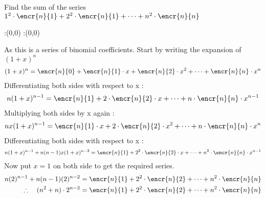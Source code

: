 



\question Find the sum of the series \\
$1^2 \cdot \encr{n}{1} + 2^2 \cdot \encr{n}{1} + \cdots + n^2 \cdot \encr{n}{n} $



\ifprintanswers
  \begin{marginfigure}
      :(0,0)
      :(0,0)
    \figdrawbegin{}
      \figdrawline [100,101]
    \figdrawend
    \figvisu{\figBoxA}{}{%
    }
    \centerline{\box\figBoxA}
  \end{marginfigure}
\fi 

\begin{solution}
As this is a series of binomial coefficients. Start by writing the expansion of $(1+x)^n$ \\
\begin{align}
(1+x)^{n} = \encr{n}{0} + \encr{n}{1} \cdot x + \encr{n}{2} \cdot {x}^{2} + \cdots + \encr{n}{n} \cdot {x}^{n}  
\end{align}  
Differentiating both sides with respect to x : \\
\begin{align}
n(1+x)^{n-1} =  \encr{n}{1} + 2 \cdot \encr{n}{2} \cdot x + \cdots + n \cdot \encr{n}{n} \cdot {x}^{n-1}
\end{align}  
Multiplying both sides by x again : \\
\begin{align}
nx(1+x)^{n-1} =  \encr{n}{1} \cdot x + 2 \cdot \encr{n}{2} \cdot x^2 + \cdots + n \cdot \encr{n}{n} \cdot {x}^{n}
\end{align}
Differentiating both sides with respect to x : \\
\begin{align}
n(1+x)^{n-1} + n(n-1)x(1+x)^{n-2} =  \encr{n}{1} + 2^2 \cdot \encr{n}{2} \cdot x + \cdots + n^2 \cdot \encr{n}{n} \cdot {x}^{n-1}
\end{align}
Now put $x=1$ on both side to get the required series. 
\begin{align}
n(2)^{n-1} + n(n-1)(2)^{n-2} &=  \encr{n}{1} + 2^2 \cdot \encr{n}{2}  + \cdots + n^2 \cdot \encr{n}{n} \\
\therefore \quad (n^2 + n)\cdot 2 ^{n-2} &= \encr{n}{1} + 2^2 \cdot \encr{n}{2}  + \cdots + n^2 \cdot \encr{n}{n}
\end{align} 
\end{solution}


